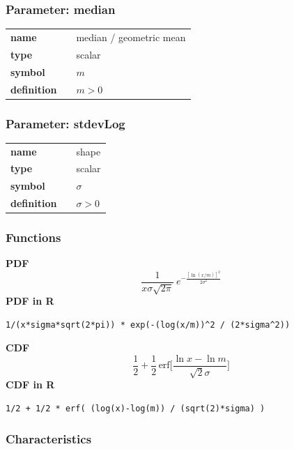 \subsubsection*{Parameter: median}

\noindent\begin{tabular}{p{2cm}cl}
\textbf{name} & & median / geometric mean \\
\textbf{type} & & scalar \\
\textbf{symbol} & & $m$  \\
\textbf{definition} & & $m>0$
\end{tabular}
\subsubsection*{Parameter: stdevLog}

\noindent\begin{tabular}{p{2cm}cl}
\textbf{name} & & shape \\
\textbf{type} & & scalar \\
\textbf{symbol} & & $\sigma$  \\
\textbf{definition} & & $\sigma > 0$
\end{tabular}
\subsubsection*{Functions}

\smallskip \noindent \hspace{.2cm} \textbf{PDF} 
\begin{equation*}\frac{1}{x\sigma\sqrt{2\pi}}\ e^{-\frac{\left[\ln (x/m)\right]^2}{2\sigma^2}}\end{equation*}
\smallskip \noindent \hspace{.2cm} \textbf{PDF in R}  
\begin{verbatim}1/(x*sigma*sqrt(2*pi)) * exp(-(log(x/m))^2 / (2*sigma^2))\end{verbatim}
\smallskip \noindent \hspace{.2cm} \textbf{CDF} 
\begin{equation*}\frac12 + \frac12\,\text{erf}\Big[\frac{\ln x-\ln m}{\sqrt{2}\sigma}\Big]\end{equation*}
\smallskip \noindent \hspace{.2cm} \textbf{CDF in R} 
\begin{verbatim}1/2 + 1/2 * erf( (log(x)-log(m)) / (sqrt(2)*sigma) )\end{verbatim}
\smallskip
\subsubsection*{Characteristics}
\smallskip
